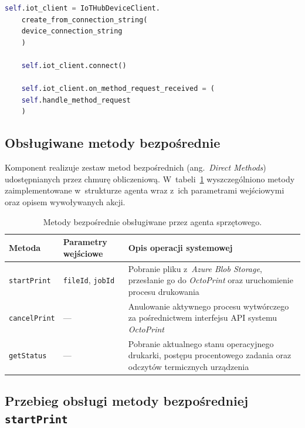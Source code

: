 \documentclass[a4paper,12pt,reqno]{article}
\begin{document}
\begin{lstlisting}[language=Python,caption={Inicjalizacja klienta usługi \textit{Azure IoT Hub} (\texttt{printer\_agent.py})}, style=pyStyle, label={lst:python_iot_init}]
	self.iot_client = IoTHubDeviceClient.
	create_from_connection_string(
	device_connection_string
	)
	
	self.iot_client.connect()
	
	self.iot_client.on_method_request_received = (
	self.handle_method_request
	)
\end{lstlisting}

\subsection{Obsługiwane metody bezpośrednie}

Komponent realizuje zestaw metod bezpośrednich (ang.~\textit{Direct Methods}) udostępnianych przez chmurę obliczeniową. W~tabeli~\ref{tab:agent_methods} wyszczególniono metody zaimplementowane w~strukturze agenta wraz z~ich parametrami wejściowymi oraz opisem wywoływanych akcji.

\begin{table}[h!]
	\centering
	\caption{Metody bezpośrednie obsługiwane przez agenta sprzętowego.}
	\label{tab:agent_methods}
	\begin{tabular}{llp{7cm}}
		\toprule
		\textbf{Metoda} & \textbf{Parametry wejściowe} & \textbf{Opis operacji systemowej} \\
		\midrule
		
		\texttt{startPrint} & \texttt{fileId}, \texttt{jobId} & Pobranie pliku z~\textit{Azure Blob Storage}, przesłanie go do \textit{OctoPrint} oraz uruchomienie procesu drukowania \\
		
		\texttt{cancelPrint} & --- & Anulowanie aktywnego procesu wytwórczego za pośrednictwem interfejsu API systemu \textit{OctoPrint} \\
		
		\texttt{getStatus} & --- & Pobranie aktualnego stanu operacyjnego drukarki, postępu procentowego zadania oraz odczytów termicznych urządzenia \\
		
		\bottomrule
	\end{tabular}
\end{table}

\subsection{Przebieg obsługi metody bezpośredniej \texttt{startPrint}}
\end{document}
